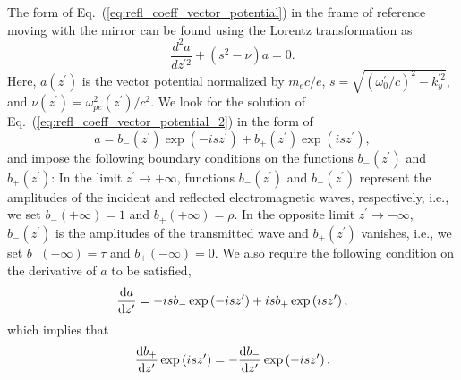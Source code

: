 \documentclass[10pt, a4paper, twoside, openright]{report}
\begin{document}
The form of Eq.~(\ref{eq:refl_coeff_vector_potential}) in the frame of reference moving with the mirror can be found using the Lorentz transformation as \cite{Panchenko2008, Bulanov2013}
\begin{equation}\label{eq:refl_coeff_vector_potential_2}
\frac{d^2 a}{d z^{\prime 2}}+ \left( s^2 - \nu \right) a = 0.
\end{equation}
Here, $ a \left( z^{\prime} \right) $ is the vector potential normalized by $ m_e c / e $, $ s = \sqrt{ \left( \omega_0^{\prime} / c \right)^2 - k_y^{\prime 2}} $, and $ \nu \left( z^{\prime} \right) = \omega_{pe}^2\left( z^{\prime} \right) / c^2 $. We look for the solution of Eq.~(\ref{eq:refl_coeff_vector_potential_2}) in the form of
\begin{equation}\label{eq:vector_potential_form}
a = b_{-} \left( z^{\prime} \right) \exp \left( -i s z^{\prime} \right) + b_{+} \left( z^{\prime} \right) \exp \left( i s z^{\prime} \right),
\end{equation}
and impose the following boundary conditions on the functions $ b_{-} \left( z^{\prime} \right) $ and $ b_{+} \left( z^{\prime} \right) $: In the limit $ z^{\prime} \rightarrow +\infty $, functions $ b_{-} \left( z^{\prime} \right) $ and $ b_{+} \left( z^{\prime} \right) $ represent the amplitudes of the incident and reflected electromagnetic waves, respectively, i.e., we set $ b_{-} \left( +\infty \right) = 1 $ and $ b_{+} \left( +\infty \right) = \rho $. In the opposite limit $ z^{\prime} \rightarrow -\infty $, $ b_{-} \left( z^{\prime} \right) $ is the amplitudes of the transmitted wave and $ b_{+} \left( z^{\prime} \right) $ vanishes, i.e., we set $ b_{-} \left( -\infty \right) = \tau $ and $ b_{+} \left( -\infty \right) = 0 $. We also require the following condition on the derivative of $ a $ to be satisfied,
\begin{equation}\label{eq:boundary_condition_1}
\diff{a}{z^{\prime}} = -i s b_{-} \exp \left( -i s z^{\prime} \right) + i s b_{+} \exp \left( i s z^{\prime} \right),
\end{equation}
which implies that
\begin{equation}\label{eq:boundary_condition_2}
\diff{b_{+}}{z^{\prime}} \exp \left( i s z^{\prime} \right) = -\diff{b_{-}}{z^{\prime}} \exp \left( -i s z^{\prime} \right).
\end{equation}
\end{document}
